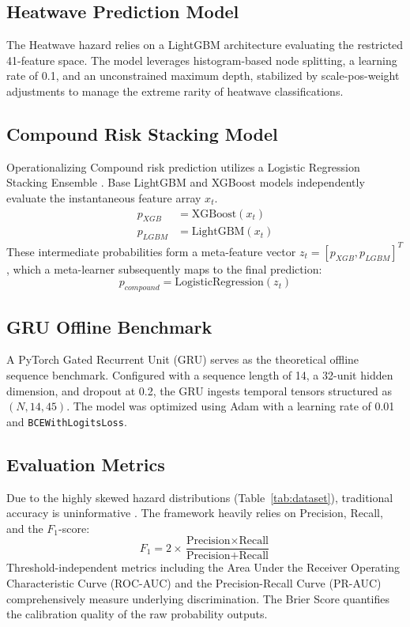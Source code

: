 \subsection{Heatwave Prediction Model}
The Heatwave hazard relies on a LightGBM architecture \cite{Ke2017} evaluating the restricted 41-feature space. The model leverages histogram-based node splitting, a learning rate of 0.1, and an unconstrained maximum depth, stabilized by scale-pos-weight adjustments to manage the extreme rarity of heatwave classifications.

\subsection{Compound Risk Stacking Model}
Operationalizing Compound risk prediction utilizes a Logistic Regression Stacking Ensemble \cite{Wolpert1992}. Base LightGBM and XGBoost \cite{Chen2016} models independently evaluate the instantaneous feature array $x_t$. 
\begin{equation}
\begin{aligned}
p_{XGB} &= \text{XGBoost}(x_t) \\
p_{LGBM} &= \text{LightGBM}(x_t)
\end{aligned}
\end{equation}
These intermediate probabilities form a meta-feature vector $z_t = [p_{XGB}, p_{LGBM}]^T$, which a meta-learner subsequently maps to the final prediction:
\begin{equation}
p_{compound} = \text{LogisticRegression}(z_t)
\end{equation}

\subsection{GRU Offline Benchmark}
A PyTorch Gated Recurrent Unit (GRU) \cite{Cho2014} serves as the theoretical offline sequence benchmark. Configured with a sequence length of 14, a 32-unit hidden dimension, and dropout at 0.2, the GRU ingests temporal tensors structured as $(N, 14, 45)$. The model was optimized using Adam with a learning rate of 0.01 and \texttt{BCEWithLogitsLoss}. 

\subsection{Evaluation Metrics}
Due to the highly skewed hazard distributions (Table~\ref{tab:dataset}), traditional accuracy is uninformative \cite{He2009}. The framework heavily relies on Precision, Recall, and the $F_1$-score:
\begin{equation}
    F_1 = 2 \times \frac{\text{Precision} \times \text{Recall}}{\text{Precision} + \text{Recall}}
\end{equation}
Threshold-independent metrics including the Area Under the Receiver Operating Characteristic Curve (ROC-AUC) and the Precision-Recall Curve (PR-AUC) comprehensively measure underlying discrimination. The Brier Score quantifies the calibration quality of the raw probability outputs.
